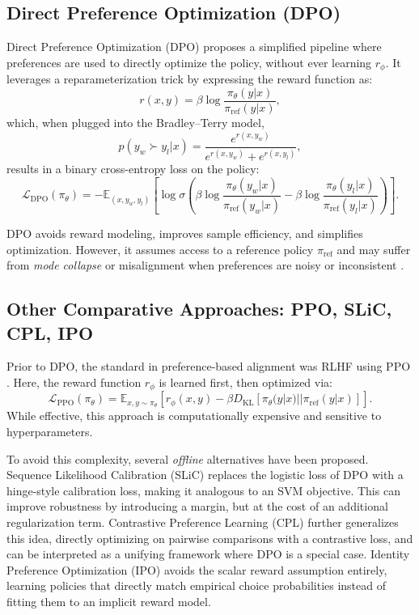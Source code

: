 \documentclass[a4paper,oneside,10pt,ngerman,english]{scrartcl}
\begin{document}
\subsection{Direct Preference Optimization (DPO)}

Direct Preference Optimization (DPO) \cite{rafailov2023direct} proposes a simplified pipeline where preferences are used to directly optimize the policy, without ever learning $r_\phi$. It leverages a reparameterization trick by expressing the reward function as:
\[
r(x, y) = \beta \log \frac{\pi_\theta(y | x)}{\pi_{\text{ref}}(y | x)},
\]
which, when plugged into the Bradley--Terry model,
\[
p(y_w \succ y_l | x) = \frac{e^{r(x, y_w)}}{e^{r(x, y_w)} + e^{r(x, y_l)}},
\]
results in a binary cross-entropy loss on the policy:
\[
\mathcal{L}_{\text{DPO}}(\pi_\theta) = -\mathbb{E}_{(x, y_w, y_l)} \left[ \log \sigma\left( \beta \log \frac{\pi_\theta(y_w|x)}{\pi_{\text{ref}}(y_w|x)} - \beta \log \frac{\pi_\theta(y_l|x)}{\pi_{\text{ref}}(y_l|x)} \right) \right].
\]

DPO avoids reward modeling, improves sample efficiency, and simplifies optimization. However, it assumes access to a reference policy $\pi_{\text{ref}}$ and may suffer from \textit{mode collapse} or misalignment when preferences are noisy or inconsistent \cite{rafailov2023direct, kirk2024understanding}.

\subsection{Other Comparative Approaches: PPO, SLiC, CPL, IPO}

Prior to DPO, the standard in preference-based alignment was RLHF using PPO \cite{schulman2017ppo}. Here, the reward function $r_\phi$ is learned first, then optimized via:
\[
\mathcal{L}_{\text{PPO}}(\pi_\theta) = \mathbb{E}_{x,y \sim \pi_\theta} \left[ r_\phi(x,y) - \beta D_{\text{KL}}[\pi_\theta(y|x) || \pi_{\text{ref}}(y|x)] \right].
\]
While effective, this approach is computationally expensive and sensitive to hyperparameters.

To avoid this complexity, several \emph{offline} alternatives have been proposed.  
Sequence Likelihood Calibration (SLiC) \cite{zhao2023slic} replaces the logistic loss of DPO with a hinge-style calibration loss, making it analogous to an SVM objective. This can improve robustness by introducing a margin, but at the cost of an additional regularization term.  
Contrastive Preference Learning (CPL) \cite{hejna2024contrastive} further generalizes this idea, directly optimizing on pairwise comparisons with a contrastive loss, and can be interpreted as a unifying framework where DPO is a special case.  
Identity Preference Optimization (IPO) \cite{azar2023ipo} avoids the scalar reward assumption entirely, learning policies that directly match empirical choice probabilities instead of fitting them to an implicit reward model.  
\end{document}
